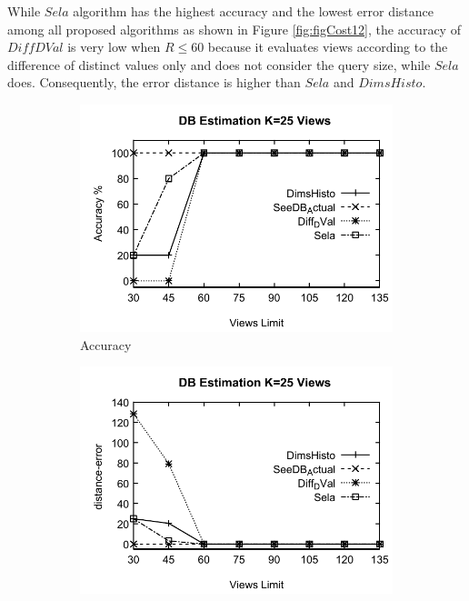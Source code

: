 While $Sela$ algorithm has the highest accuracy and the lowest error distance among all proposed algorithms as shown in Figure \ref{fig:figCost12}, the accuracy of $Diff DVal$ is very low when $R \leq 60$ because it evaluates views according to the difference of distinct values only and does not consider the query size, while $Sela$ does.
Consequently, the error distance is higher than $Sela$ and $DimsHisto$.
%
\begin{figure}[t]
  \begin{subfigure}[b]{0.32\textwidth}
    \includegraphics[width=\textwidth]{Cost11.pdf}
    \caption{Accuracy }
       \label{fig:figCost11}
  \end{subfigure}
	\begin{subfigure}[b]{0.32\textwidth}
    \includegraphics[width=\textwidth]{Cost12.pdf}

\end{subfigure}
\end{figure}
